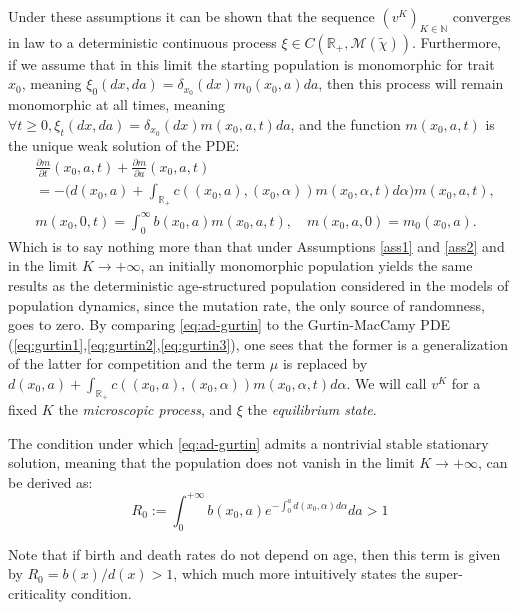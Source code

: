 \documentclass[11pt, a4paper]{article}
\theoremstyle{definition}
\begin{document}
   Under these assumptions it can be shown that the sequence $(v^K)_{K\in \mathbb{N}}$ converges in law to a deterministic continuous process $\xi \in C(\mathbb{R}_+, \mathcal{M}(\tilde{\chi}))$. Furthermore, if we assume that in this limit the starting population is monomorphic for trait $x_0$, meaning $\xi_0(dx,da) = \delta_{x_0}(dx)m_0(x_0,a)da$, then this process will remain monomorphic at all times, meaning $\forall t\geq0, \xi_t(dx,da) = \delta_{x_0}(dx)m(x_0,a,t)da$, and the
   function $m(x_0,a,t)$ is the unique weak solution of the PDE:
   \begin{align}\label{eq:ad-gurtin}
       &\frac{\partial m}{\partial t}(x_0,a,t) + \frac{\partial m}{\partial a}(x_0,a,t) \nonumber \\
       &= - \Big( d(x_0,a) + \int_{\mathbb{R}_+} c((x_0,a),(x_0,\alpha)) m(x_0,\alpha,t)d\alpha \Big) m(x_0,a,t),\\
       &m(x_0,0,t) = \int_0^{\infty} b(x_0,a)m(x_0,a,t),\quad m(x_0,a,0) = m_0(x_0,a).\nonumber
   \end{align}
   Which is to say nothing more than that under Assumptions \ref{ass1} and \ref{ass2} and in the limit $K\rightarrow +\infty$, an initially monomorphic population yields the same results as the deterministic age-structured population considered in the models of population dynamics, since the mutation rate, the only source of randomness, goes to zero. By comparing \eqref{eq:ad-gurtin} to the Gurtin-MacCamy PDE (\ref{eq:gurtin1},\ref{eq:gurtin2},\ref{eq:gurtin3}), one sees that the former is a generalization of the latter for competition and the term $\mu$ is replaced by $d(x_0,a) +
   \int_{\mathbb{R}_+} c((x_0,a),(x_0,\alpha)) m(x_0,\alpha,t)d\alpha$.
We will call $v^K$ for a fixed $K$ the \emph{microscopic process}, and $\xi$ the \emph{equilibrium state}.
   
   The condition under which \eqref{eq:ad-gurtin} admits a nontrivial stable stationary solution, meaning that the population does not vanish in the limit $K\rightarrow +\infty$, can be derived as:
    \begin{equation}\label{eq:supercrit}
        R_0 := \int_0^{+\infty} b(x_0,a) e^{-\int_0^a d(x_0,\alpha)d\alpha}da > 1
    \end{equation}

    \noindent Note that if birth and death rates do not depend on age, then this term is given by $R_0 = b(x)/d(x) > 1$, which much more intuitively states the super-criticality condition.
\end{document}

